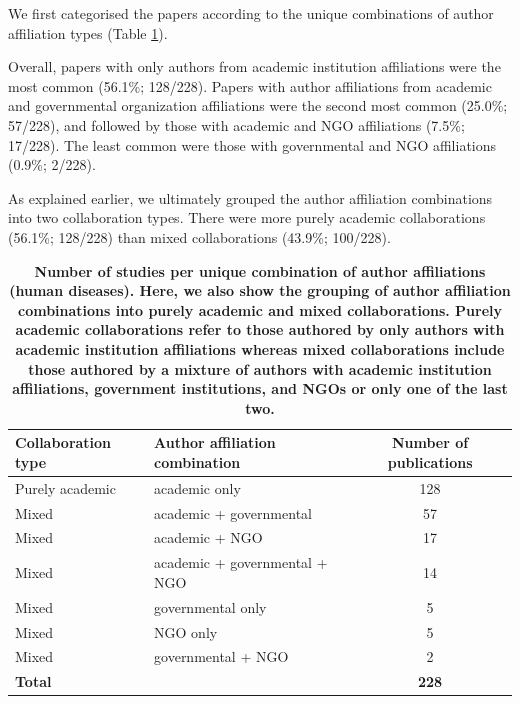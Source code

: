 \documentclass[10pt,letterpaper]{article}
\begin{document}
We first categorised the papers according to the unique combinations of author affiliation types (Table \ref{studies_per_author_affiliations_type}). 

Overall, papers with only authors from academic institution affiliations were the most common (56.1\%; 128/228). Papers with author affiliations from academic and governmental organization affiliations were the second most common (25.0\%; 57/228), and followed by those with academic and NGO affiliations (7.5\%; 17/228). The least common were those with governmental and NGO affiliations (0.9\%; 2/228).

As explained earlier, we ultimately grouped the author affiliation combinations into two collaboration types. There were more purely academic collaborations (56.1\%; 128/228) than mixed collaborations (43.9\%; 100/228). 

\begin{table}[!h]
\centering
\caption{\bf Number of studies per unique combination of author affiliations (human diseases). Here, we also show the grouping of author affiliation combinations into purely academic and mixed collaborations. Purely academic collaborations refer to those authored by only authors with academic institution affiliations whereas mixed collaborations include those authored by a mixture of authors with academic institution affiliations, government institutions, and NGOs or only one of the last two.}
\setlength\arrayrulewidth{1pt} 
\begin{tabular}{|l l c|}
\hline
\textbf{Collaboration type} & \textbf{Author affiliation combination} & \textbf{Number of publications} \\ \hline
Purely academic & academic only  & 128 \\ \hline
Mixed & academic + governmental   & 57 \\ \hline
Mixed & academic + NGO                 & 17  \\ \hline
Mixed & academic + governmental + NGO    & 14 \\ \hline
Mixed & governmental only                & 5 \\ \hline
Mixed & NGO only                       & 5  \\ \hline
Mixed & governmental + NGO               & 2 \\ \hline  \rowcolor{gray!20}
\textbf{Total} &  & \textbf{228} \\  \hline 
\end{tabular}
\label{studies_per_author_affiliations_type}
\end{table}
\end{document}
